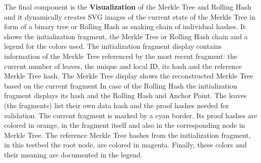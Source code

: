 The final component is the \textbf{Visualization} of the Merkle Tree and Rolling Hash and it dynamically creates SVG images of the current state of the Merkle Tree in form of a binary tree or Rolling Hash as snaking chain of individual hashes. It shows the initialization fragment, the Merkle Tree or Rolling Hash chain and a legend for the colors used. The initialization fragment display contains information of the Merkle Tree referenced by the most recent fragment: the current number of leaves, the unique and local ID, its hash and the reference Merkle Tree hash. The Merkle Tree display shows the reconstructed Merkle Tree based on the current fragment In case of the Rolling Hash the initialization fragment displays its hash and the Rolling Hash and Anchor Point. The leaves (the fragments) list their own data hash and the proof hashes needed for validation. The current fragment is marked by a cyan border. Its proof hashes are colored in orange, in the fragment itself and also in the corresponding node in Merkle Tree. The reference Merkle Tree hashes from the initialization fragment, in this testbed the root node, are colored in magenta. Finally, these colors and their meaning are documented in the legend.
